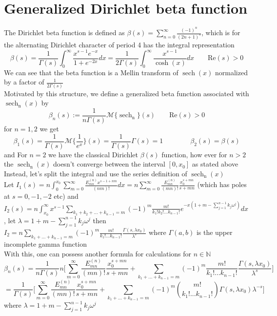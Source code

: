\documentclass{article}
\DeclareMathOperator{\sech}{sech}
\newcommand{\NotDefinedsech}[2]{\operatorname{\sech_{#1}\text{#2}}}
\begin{document}
\section{Generalized Dirichlet beta function}
The Dirichlet beta function is defined as $\beta(s) = \sum_{n=0}^{\infty}{\frac{(-1)^n}{(2n+1)^s}}$, which is for the alternating Dirichlet character of period 4 has the integral representation
\[\beta(s) = \frac{1}{\Gamma(s)}\int_{0}^{\infty}\frac{x^{s-1}e^{-x}}{1+e^{-2x}}dx = \frac{1}{2\Gamma(s)}\int_{0}^{\infty}\frac{x^{s-1}}{\cosh(x)}dx \qquad \text{Re}(s)>0\]
We can see that the beta function is a Mellin transform of $\sech(x)$ normalized by a factor of $\frac{1}{2\Gamma(s)}$\\
Motivated by this structure, we define a generalized beta function associated with $\NotDefinedsech{n}{}(x)$ by
\[\beta_n (s) := \frac{1}{n\Gamma(s)}\mathcal{M}\{\NotDefinedsech{n}{}\}(s) \qquad \text{Re}(s)>0\]
for $n=1,2$ we get
\[\beta_1(s)=\frac{1}{\Gamma(s)}\mathcal{M}{\{\frac{1}{e^x}\}} (s)= \frac{1}{\Gamma(s)}\Gamma(s) = 1 \qquad \qquad \beta_2(s) = \beta(s)\]
and For $n=2$ we have the classical Dirichlet  $\beta(s)$ function, how ever for $n>2$ the $\NotDefinedsech{n}{}(x)$ doesn't converge between the interval $[0,x_0]$ as stated above\\
Instead, let's split the integral and use the series definition of $\NotDefinedsech{n}{}(x)$ \\
Let $I_1(s) = n\int_{0}^{x_0}\sum_{m=0}^{\infty}\frac{E^{(n)}_{mn}x^{s-1+nm}}{(nm)!} dx = n \sum_{m=0}^{\infty} \frac{E^{(n)}_{mn}}{(mn)!} \frac{x_0^{s+mn}}{s+mn}$ (which has poles at $s=0,-1,-2$ etc) and 
$I_2(s) = n\int_{x_0}^{\infty} x^{s-1}\sum_{k_1+k_2+...+k_{n-1} = m} (-1)^m\frac{m!}{k_1! k_2! ... k_{n-1}!} e^{-x(1+m-\sum_{j=1}^{n-1}k_j\omega^j)}dx$, let $\lambda = 1+m-\sum_{j=1}^{n-1}k_j\omega^j$ then $I_2 = n \sum_{k_1+...+k_{n-1} = m}(-1)^m \frac{m!}{k_1! ... k_{n-1}!}\frac{\Gamma(s,\lambda x_0)}{\lambda^s}$ where $\Gamma(a,b)$ is the upper incomplete gamma function \\
With this, one can possess another formula for calculations for $n\in\mathbb{N}$ 
\[\beta_n(s)=\frac{1}{n\Gamma(s)}n \bigg[ \sum_{m=0}^{\infty} \frac{E^{(n)}_{mn}}{(mn)!} \frac{x_0^{s+mn}}{s+mn}+\sum_{k_1+...+k_{n-1} = m}(-1)^m \frac{m!}{k_1! ... k_{n-1}!}\frac{\Gamma(s,\lambda x_0)}{\lambda^s}\bigg]\] 
\[=\frac{1}{\Gamma(s)} \bigg[ \sum_{m=0}^{\infty} \frac{E^{(n)}_{mn}}{(mn)!} \frac{x_0^{s+mn}}{s+mn}+\sum_{k_1+...+k_{n-1} = m}(-1)^m \binom{m!}{k_1! ... k_{n-1}!}\Gamma(s,\lambda x_0)\lambda^{-s}\bigg] \]
where $\lambda = 1+m-\sum_{j=1}^{n-1}k_j\omega^j$ \\
\end{document}
